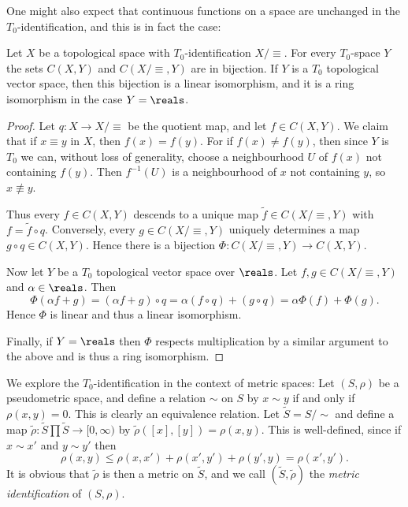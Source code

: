 \documentclass[article, a4paper, 11pt, oneside]{memoir}
\numberwithin{equation}{chapter}
\newcommand{\preim}{^{-1}}
\begin{document}
One might also expect that continuous functions on a space are unchanged in the $T_0$-identification, and this is in fact the case:

\begin{proposition}
    \label{thm:T0-identification-continuous-functions}
    Let $X$ be a topological space with $T_0$-identification $X/{\equiv}$. For every $T_0$-space $Y$ the sets $C(X,Y)$ and $C(X/{\equiv},Y)$ are in bijection. If $Y$ is a $T_0$ topological vector space\footnotemark, then this bijection is a linear isomorphism, and it is a ring isomorphism in the case $Y = \reals$.
\end{proposition}

\begin{proof}
    Let $q \colon X \to X/{\equiv}$ be the quotient map, and let $f \in C(X,Y)$. We claim that if $x \equiv y$ in $X$, then $f(x) = f(y)$. For if $f(x) \neq f(y)$, then since $Y$ is $T_0$ we can, without loss of generality, choose a neighbourhood $U$ of $f(x)$ not containing $f(y)$. Then $f\preim(U)$ is a neighbourhood of $x$ not containing $y$, so $x \not\equiv y$.

    Thus every $f \in C(X,Y)$ descends to a unique map $\tilde{f} \in C(X/{\equiv},Y)$ with $f = \tilde{f} \circ q$. Conversely, every $g \in C(X/{\equiv},Y)$ uniquely determines a map $g \circ q \in C(X,Y)$. Hence there is a bijection $\Phi \colon C(X/{\equiv},Y) \to C(X,Y)$.

    Now let $Y$ be a $T_0$ topological vector space over $\reals$. Let $f,g \in C(X/{\equiv},Y)$ and $\alpha \in \reals$. Then
    \begin{equation*}
        \Phi(\alpha f + g)
            = (\alpha f + g) \circ q
            = \alpha (f \circ q) + (g \circ q)
            = \alpha \Phi(f) + \Phi(g).
    \end{equation*}
    Hence $\Phi$ is linear and thus a linear isomorphism.

    Finally, if $Y = \reals$ then $\Phi$ respects multiplication by a similar argument to the above and is thus a ring isomorphism.
\end{proof}


We explore the $T_0$-identification in the context of metric spaces: Let $(S,\rho)$ be a pseudometric space, and define a relation $\sim$ on $S$ by $x \sim y$ if and only if $\rho(x,y) = 0$. This is clearly an equivalence relation. Let $\tilde{S} = S/{\sim}$ and define a map $\tilde{\rho} \colon \tilde{S} \prod \tilde{S} \to [0,\infty)$ by $\tilde{\rho}([x],[y]) = \rho(x,y)$. This is well-defined, since if $x \sim x'$ and $y \sim y'$ then
%
\begin{equation*}
    \rho(x,y)
        \leq \rho(x,x') + \rho(x',y') + \rho(y',y)
        = \rho(x',y').
\end{equation*}
%
It is obvious that $\tilde{\rho}$ is then a metric on $\tilde{S}$, and we call $(\tilde{S}, \tilde{\rho})$ the \emph{metric identification} of $(S,\rho)$.
\end{document}
